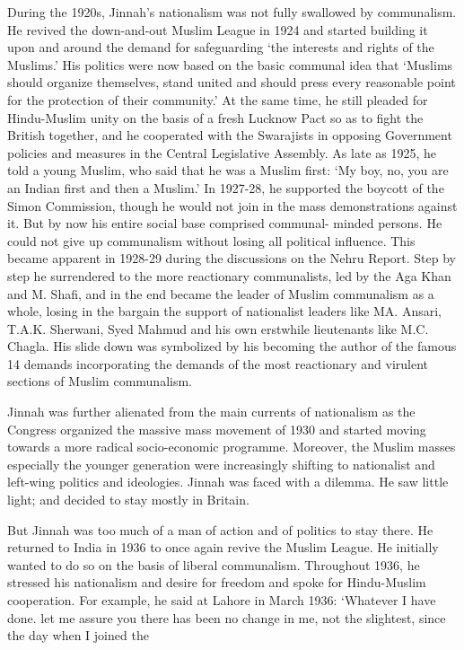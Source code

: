 During the 1920s, Jinnah's nationalism was not fully swallowed by communalism. He revived the down-and-out Muslim League in 1924 and started building it upon and around the demand for safeguarding `the interests and rights of the Muslims.' His politics were now based on the basic communal idea that `Muslims should organize themselves, stand united and should press every reasonable point for the protection of their community.' At the same time, he still pleaded for Hindu-Muslim unity on the basis of a fresh Lucknow Pact so as to fight the British together, and he cooperated with the Swarajists in opposing Government policies and measures in the Central Legislative Assembly. As late as 1925, he told a young Muslim, who said that he was a Muslim first: `My boy, no, you are an Indian first and then a Muslim.' In 1927-28, he supported the boycott of the Simon Commission, though he would not join in the mass demonstrations against it. But by now his entire social base comprised communal- minded persons. He could not give up communalism without losing all political influence. This became apparent in 1928-29 during the discussions on the Nehru Report. Step by step he surrendered to the more reactionary communalists, led by the Aga Khan and M. Shafi, and in the end became the leader of Muslim communalism as a whole, losing in the bargain the support of nationalist leaders like MA. Ansari, T.A.K. Sherwani, Syed Mahmud and his own erstwhile lieutenants like M.C. Chagla. His slide down was symbolized by his becoming the author of the famous 14 demands incorporating the demands of the most reactionary and virulent sections of Muslim communalism. 

Jinnah was further alienated from the main currents of nationalism as the Congress organized the massive mass movement of 1930 and started moving towards a more radical socio-economic programme. Moreover, the Muslim masses especially the younger generation were increasingly shifting to nationalist and left-wing politics and ideologies. Jinnah was faced with a dilemma. He saw little light; and decided to stay mostly in Britain. 

But Jinnah was too much of a man of action and of politics to stay there. He returned to India in 1936 to once again revive the Muslim League. He initially wanted to do so on the basis of liberal communalism. Throughout 1936, he stressed his nationalism and desire for freedom and spoke for Hindu-Muslim cooperation. For example, he said at Lahore in March 1936: `Whatever I have done. let me assure you there has been no change in me, not the slightest, since the day when I joined the 

